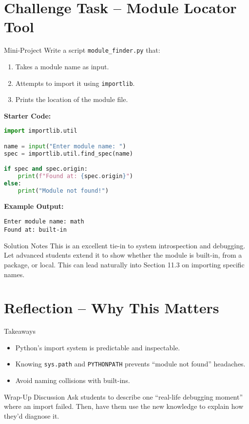 \documentclass[12pt]{article}
\begin{document}
\section{Challenge Task – Module Locator Tool}

\begin{activitybox}{Mini-Project}
Write a script \texttt{module\_finder.py} that:
\begin{enumerate}
  \item Takes a module name as input.
  \item Attempts to import it using \texttt{importlib}.
  \item Prints the location of the module file.
\end{enumerate}

\textbf{Starter Code:}
\begin{lstlisting}[language=Python]
import importlib.util

name = input("Enter module name: ")
spec = importlib.util.find_spec(name)

if spec and spec.origin:
    print(f"Found at: {spec.origin}")
else:
    print("Module not found!")
\end{lstlisting}

\textbf{Example Output:}
\begin{lstlisting}
Enter module name: math
Found at: built-in
\end{lstlisting}
\end{activitybox}

\begin{teacherbox}{Solution Notes}
This is an excellent tie-in to system introspection and debugging.  
Let advanced students extend it to show whether the module is built-in, from a package, or local.  
This can lead naturally into Section 11.3 on importing specific names.
\end{teacherbox}

\section{Reflection – Why This Matters}

\begin{reflectionbox}{Takeaways}
\begin{itemize}
  \item Python’s import system is predictable and inspectable.
  \item Knowing \texttt{sys.path} and \texttt{PYTHONPATH} prevents “module not found” headaches.
  \item Avoid naming collisions with built-ins.
\end{itemize}
\end{reflectionbox}

\begin{teacherbox}{Wrap-Up Discussion}
Ask students to describe one “real-life debugging moment” where an import failed.  
Then, have them use the new knowledge to explain how they’d diagnose it.
\end{teacherbox}

\end{document}
